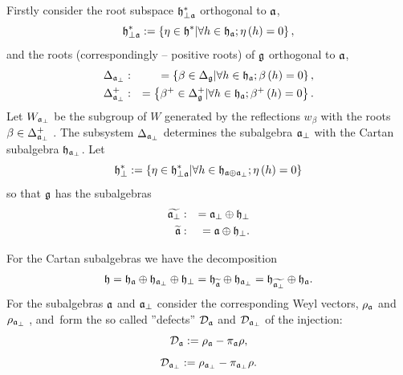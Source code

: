 \documentclass[12pt]{article}
\theoremstyle{definition}
\begin{document}
Firstly consider the root subspace $\frak{h}_{\perp \frak{a}}^{\ast }$
orthogonal to $\frak{a}$,
\[
\frak{h}_{\perp \frak{a}}^{\ast }:=\left\{ \eta \in \frak{h}^{\ast }|\forall
h\in \frak{h}_{\frak{a}};\eta \left( h\right) =0\right\} , 
\]
and the roots (correspondingly -- positive roots) of $\frak{g}$ orthogonal
to $\frak{a}$, 
\begin{eqnarray*}
\Delta _{\frak{a}_{\perp }} &:&=\left\{ \beta \in \Delta _{\frak{g}}|\forall
h\in \frak{h}_{\frak{a}};\beta \left( h\right) =0\right\} , \\
\Delta _{\frak{a}_{\perp }}^{+} &:&=\left\{ \beta ^{+}\in \Delta _{\frak{g}%
}^{+}|\forall h\in \frak{h}_{\frak{a}};\beta ^{+}\left( h\right) =0\right\} .
\end{eqnarray*}
Let $W_{\frak{a}_{\perp }}$ be the subgroup of $W$ generated by the
reflections $w_{\beta }$ with the roots $\beta \in \Delta _{\frak{a}_{\perp
}}^{+}$ . The subsystem $\Delta _{\frak{a}_{\perp }}$ determines the
subalgebra $\frak{a}_{\perp }$ with the Cartan subalgebra $\frak{h}_{\frak{a}%
_{\perp }}$. Let 
\[
\frak{h}_{\perp }^{\ast }:=\left\{ \eta \in \frak{h}_{\perp \frak{a}}^{\ast
}|\forall h\in \frak{h}_{\frak{a}\oplus \frak{a}_{\perp }};\eta \left(
h\right) =0\right\} 
\]
so that $\frak{g}$ has the subalgebras 
\begin{eqnarray*}
\widetilde{\frak{a}_{\perp }} &:&=\frak{a}_{\perp }\oplus \frak{h}_{\perp }
\\
\widetilde{\frak{a}} &:&=\frak{a}\oplus \frak{h}_{\perp }.
\end{eqnarray*}

For the Cartan subalgebras we have the decomposition 
\begin{equation}
\frak{h}=\frak{\frak{h}_{\frak{a}}}\oplus \frak{h}_{\frak{a}_{\perp }}\oplus 
\frak{h}_{\perp }=\frak{\frak{h}_{\widetilde{\frak{a}}}}\oplus \frak{h}_{%
\frak{a}_{\perp }}=\frak{\frak{h}_{\widetilde{\frak{a}_{\perp }}}}\oplus 
\frak{h}_{\frak{a}}.
\end{equation}
For the subalgebras $\frak{a}$ and $\frak{a}_{\perp }$ consider the
corresponding Weyl vectors, $\rho _{\frak{a}}$ and $\rho _{\frak{a}_{\perp }}
$ , and\ form the so called ''defects'' $\mathcal{D}_{\frak{a}}$ and $%
\mathcal{D}_{\frak{a}_{\perp }}$ of the injection:
\begin{equation}
\mathcal{D}_{\frak{a}}:=\rho _{\frak{a}}-\pi _{\frak{a}}\rho ,
\end{equation}
\begin{equation}
\mathcal{D}_{\frak{a}_{\perp }}:=\rho _{\frak{a}_{\perp }}-\pi _{\frak{a}%
_{\perp }}\rho .  \label{defect ort}
\end{equation}
\end{document}
